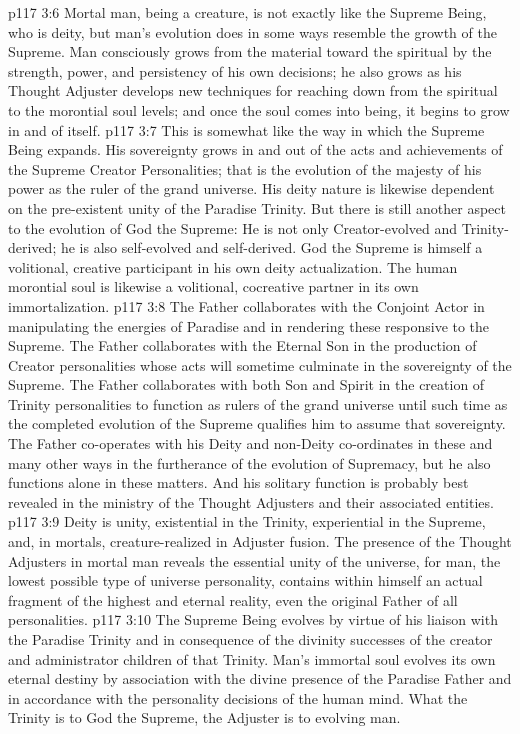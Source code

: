 \vs p117 3:6 Mortal man, being a creature, is not exactly like the Supreme Being, who is deity, but man’s evolution does in some ways resemble the growth of the Supreme. Man consciously grows from the material toward the spiritual by the strength, power, and persistency of his own decisions; he also grows as his Thought Adjuster develops new techniques for reaching down from the spiritual to the morontial soul levels; and once the soul comes into being, it begins to grow in and of itself.
\vs p117 3:7 This is somewhat like the way in which the Supreme Being expands. His sovereignty grows in and out of the acts and achievements of the Supreme Creator Personalities; that is the evolution of the majesty of his power as the ruler of the grand universe. His deity nature is likewise dependent on the pre\hyp{}existent unity of the Paradise Trinity. But there is still another aspect to the evolution of God the Supreme: He is not only Creator\hyp{}evolved and Trinity\hyp{}derived; he is also self\hyp{}evolved and self\hyp{}derived. God the Supreme is himself a volitional, creative participant in his own deity actualization. The human morontial soul is likewise a volitional, cocreative partner in its own immortalization.
\pc \vs p117 3:8 The Father collaborates with the Conjoint Actor in manipulating the energies of Paradise and in rendering these responsive to the Supreme. The Father collaborates with the Eternal Son in the production of Creator personalities whose acts will sometime culminate in the sovereignty of the Supreme. The Father collaborates with both Son and Spirit in the creation of Trinity personalities to function as rulers of the grand universe until such time as the completed evolution of the Supreme qualifies him to assume that sovereignty. The Father co\hyp{}operates with his Deity and non\hyp{}Deity co\hyp{}ordinates in these and many other ways in the furtherance of the evolution of Supremacy, but he also functions alone in these matters. And his solitary function is probably best revealed in the ministry of the Thought Adjusters and their associated entities.
\vs p117 3:9 Deity is unity, existential in the Trinity, experiential in the Supreme, and, in mortals, creature\hyp{}realized in Adjuster fusion. The presence of the Thought Adjusters in mortal man reveals the essential unity of the universe, for man, the lowest possible type of universe personality, contains within himself an actual fragment of the highest and eternal reality, even the original Father of all personalities.
\vs p117 3:10 The Supreme Being evolves by virtue of his liaison with the Paradise Trinity and in consequence of the divinity successes of the creator and administrator children of that Trinity. Man’s immortal soul evolves its own eternal destiny by association with the divine presence of the Paradise Father and in accordance with the personality decisions of the human mind. What the Trinity is to God the Supreme, the Adjuster is to evolving man.\plusone
